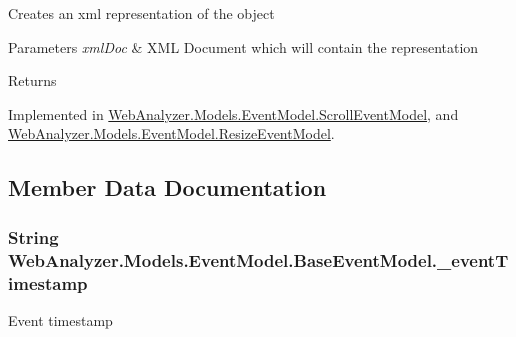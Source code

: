 Creates an xml representation of the object 


\begin{DoxyParams}{Parameters}
{\em xml\+Doc} & X\+M\+L Document which will contain the representation\\
\hline
\end{DoxyParams}
\begin{DoxyReturn}{Returns}

\end{DoxyReturn}


Implemented in \hyperlink{class_web_analyzer_1_1_models_1_1_event_model_1_1_scroll_event_model_a31a31878863b84ba68338278f0624c9f}{Web\+Analyzer.\+Models.\+Event\+Model.\+Scroll\+Event\+Model}, and \hyperlink{class_web_analyzer_1_1_models_1_1_event_model_1_1_resize_event_model_a55f5533548b548490cfb7342f075f8e0}{Web\+Analyzer.\+Models.\+Event\+Model.\+Resize\+Event\+Model}.



\subsection{Member Data Documentation}
\hypertarget{class_web_analyzer_1_1_models_1_1_event_model_1_1_base_event_model_ab4e25a53d20e317344a9df113ec2aab7}{}
\subsubsection[{\+\_\+event\+Timestamp}]{\setlength{\rightskip}{0pt plus 5cm}String Web\+Analyzer.\+Models.\+Event\+Model.\+Base\+Event\+Model.\+\_\+event\+Timestamp\hspace{0.3cm}{\ttfamily [protected]}}\label{class_web_analyzer_1_1_models_1_1_event_model_1_1_base_event_model_ab4e25a53d20e317344a9df113ec2aab7}


Event timestamp 

\hypertarget{class_web_analyzer_1_1_models_1_1_event_model_1_1_base_event_model_a8cfc8644deaf4edfec7fcd7f08dfa20c}{}
